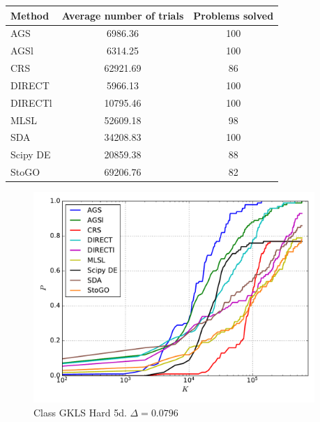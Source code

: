 \documentclass[a4paper]{article}
\begin{document}
\begin{tabular}{lcc}
\hline
 Method   &  Average number of trials  &  Problems solved  \\
\hline
 AGS      &          6986.36           &        100        \\
 AGSl     &          6314.25           &        100        \\
 CRS      &          62921.69          &        86         \\
 DIRECT   &          5966.13           &        100        \\
 DIRECTl  &          10795.46          &        100        \\
 MLSL     &          52609.18          &        98         \\
 SDA      &          34208.83          &        100        \\
 Scipy DE &          20859.38          &        88         \\
 StoGO    &          69206.76          &        82         \\
\hline
\end{tabular}
\begin{figure}[H]
  \center
  \includegraphics[width=0.95\textwidth]{../experiments/gklsh5d_serg/cmc.pdf}
  \caption{Class GKLS Hard 5d. $\Delta=0.0796$}

\end{figure}
\end{document}
